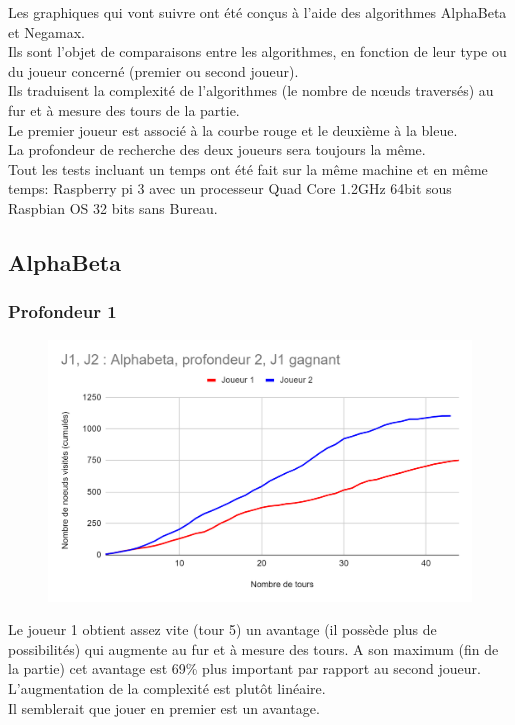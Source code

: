 \documentclass[12pt]{article}
\begin{document}
Les graphiques qui vont suivre ont été conçus à l’aide des algorithmes AlphaBeta et Negamax.\\
Ils sont l’objet de comparaisons entre les algorithmes, en fonction de leur type ou du joueur concerné (premier ou second joueur).\\
Ils traduisent la complexité de l’algorithmes (le nombre de nœuds traversés) au fur et à mesure des tours de la partie.\\
Le premier joueur est associé à la courbe rouge et le deuxième à la bleue.\\
La profondeur de recherche des deux joueurs sera toujours la même.\\

Tout les tests incluant un temps ont été fait sur la même machine et en même temps: Raspberry pi 3 avec un processeur Quad Core 1.2GHz 64bit sous Raspbian OS 32 bits sans Bureau.
\newpage
\subsection{AlphaBeta}

\subsubsection{Profondeur 1}

\begin{figure}[!h]
   \includegraphics[width=\textwidth]{prof1alphabeta.png}
\end{figure}

Le joueur 1 obtient assez vite (tour 5) un avantage (il possède plus de possibilités) qui augmente au fur et à mesure des tours. A son maximum (fin de la partie) cet avantage est 69\% plus important par rapport au second joueur.\\
L’augmentation de la complexité est plutôt linéaire.\\
Il semblerait que jouer en premier est un avantage.
\newpage
\end{document}
